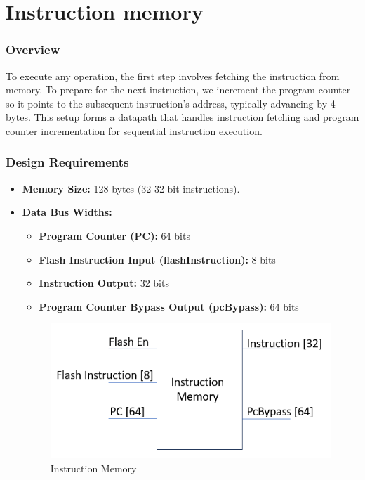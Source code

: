 \section{Instruction memory}
\subsubsection{Overview}
To execute any operation, the first step involves fetching the instruction from memory. To prepare for the next instruction, we increment the program counter so it points to the subsequent instruction's address, typically advancing by 4 bytes. This setup forms a datapath that handles instruction fetching and program counter incrementation for sequential instruction execution.

\subsubsection{Design Requirements}
\begin{itemize}
    \item \textbf{Memory Size:} 128 bytes (32 32-bit instructions). 
    \item \textbf{Data Bus Widths:}
    \begin{itemize}
    \item \textbf{Program Counter (PC):} 64 bits
    \item \textbf{Flash Instruction Input (flashInstruction):} 8 bits
    \item \textbf{Instruction Output: } 32 bits
    \item \textbf{Program Counter Bypass Output (pcBypass): } 64 bits 
   
    \end{itemize}
    \begin{figure}[H]
    \centering
    \includegraphics[width=0.5
    \linewidth]{Image/Instruction_Memory.png}
    \caption{Instruction Memory}
    \label{fig:enter-label}
\end{figure}
\end{itemize}
